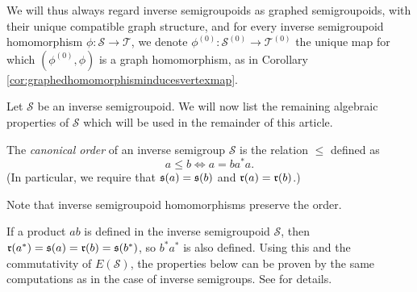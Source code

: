 We will thus always regard inverse semigroupoids as graphed semigroupoids, with their unique compatible graph structure, and for every inverse semigroupoid homomorphism $\phi\colon\mathcal{S}\to\mathcal{T}$, we denote $\phi^{(0)}\colon\mathcal{S}^{(0)}\to\mathcal{T}^{(0)}$ the unique map for which $(\phi^{(0)},\phi)$ is a graph homomorphism, as in Corollary \ref{cor:graphedhomomorphisminducesvertexmap}.

Let $\mathcal{S}$ be an inverse semigroupoid. We will now list the remaining algebraic properties of $\mathcal{S}$ which will be used in the remainder of this article.

\begin{definition}
The \emph{canonical order} of an inverse semigroup $\mathcal{S}$ is the relation $\leq$ defined as
\[a\leq b\iff a=ba^*a.\]
(In particular, we require that $\operatorname{\mathfrak{s}}(a)=\operatorname{\mathfrak{s}}(b)$ and $\operatorname{\mathfrak{r}}(a)=\operatorname{\mathfrak{r}}(b)$.)
\end{definition}

Note that inverse semigroupoid homomorphisms preserve the order. 

If a product $ab$ is defined in the inverse semigroupoid $\mathcal{S}$, then $\operatorname{\mathfrak{r}}(a^*)=\operatorname{\mathfrak{s}}(a)=\operatorname{\mathfrak{r}}(b)=\operatorname{\mathfrak{s}}(b^*)$, so $b^*a^*$ is also defined. Using this and the commutativity of $E(\mathcal{S})$, the properties below can be proven by the same computations as in the case of inverse semigroups. See \cite[Chapter 5]{MR1455373} for details.

